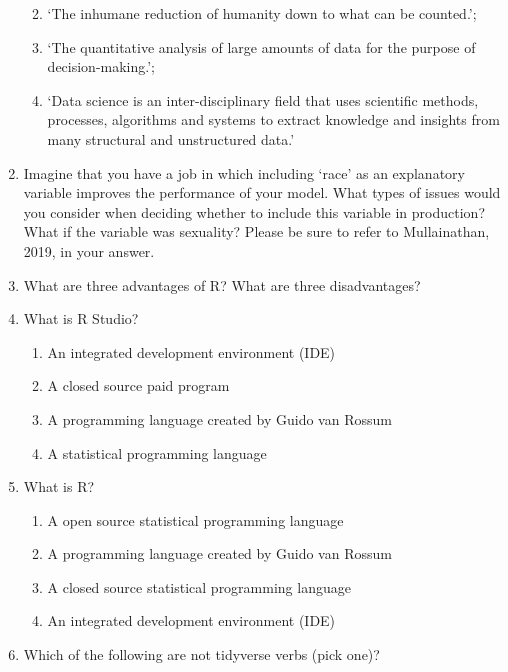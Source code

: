 \documentclass[
]{book}
\providecommand{\tightlist}{%
  \setlength{\itemsep}{0pt}\setlength{\parskip}{0pt}}
\begin{document}
\begin{enumerate}
  \begin{enumerate}
  \def\labelenumii{\alph{enumii}.}
  \tightlist
  \item
    `The inhumane reduction of humanity down to what can be counted.';
  \item
    `The quantitative analysis of large amounts of data for the purpose of decision-making.';
  \item
    `Data science is an inter-disciplinary field that uses scientific methods, processes, algorithms and systems to extract knowledge and insights from many structural and unstructured data.'
  \end{enumerate}
\item
  Imagine that you have a job in which including `race' as an explanatory variable improves the performance of your model. What types of issues would you consider when deciding whether to include this variable in production? What if the variable was sexuality? Please be sure to refer to Mullainathan, 2019, in your answer.
\item
  What are three advantages of R? What are three disadvantages?
\item
  What is R Studio?

  \begin{enumerate}
  \def\labelenumii{\alph{enumii}.}
  \tightlist
  \item
    An integrated development environment (IDE)
  \item
    A closed source paid program
  \item
    A programming language created by Guido van Rossum
  \item
    A statistical programming language
  \end{enumerate}
\item
  What is R?

  \begin{enumerate}
  \def\labelenumii{\alph{enumii}.}
  \tightlist
  \item
    A open source statistical programming language
  \item
    A programming language created by Guido van Rossum
  \item
    A closed source statistical programming language
  \item
    An integrated development environment (IDE)
  \end{enumerate}
\item
  Which of the following are not tidyverse verbs (pick one)?


\end{enumerate}
\end{document}
